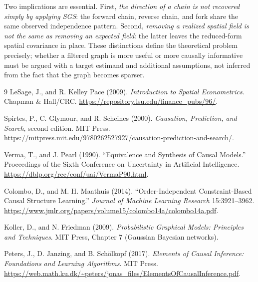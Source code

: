 \documentclass[11pt,a4paper]{article}
\begin{document}
Two implications are essential. First, \emph{the direction of a chain is not recovered simply by applying SGS}: the forward chain, reverse chain, and fork share the same observed independence pattern. Second, \emph{removing a realized spatial field is not the same as removing an expected field}: the latter leaves the reduced-form spatial covariance in place. These distinctions define the theoretical problem precisely; whether a filtered graph is more useful or more causally informative must be argued with a target estimand and additional assumptions, not inferred from the fact that the graph becomes sparser.

{\small
\begin{thebibliography}{9}
LeSage, J., and R. Kelley Pace (2009).
\emph{Introduction to Spatial Econometrics}. Chapman \& Hall/CRC.
\url{https://repository.lsu.edu/finance_pubs/96/}.

Spirtes, P., C. Glymour, and R. Scheines (2000).
\emph{Causation, Prediction, and Search}, second edition. MIT Press.
\url{https://mitpress.mit.edu/9780262527927/causation-prediction-and-search/}.

Verma, T., and J. Pearl (1990).
``Equivalence and Synthesis of Causal Models.''
Proceedings of the Sixth Conference on Uncertainty in Artificial Intelligence.
\url{https://dblp.org/rec/conf/uai/VermaP90.html}.

Colombo, D., and M. H. Maathuis (2014).
``Order-Independent Constraint-Based Causal Structure Learning.''
\emph{Journal of Machine Learning Research} 15:3921--3962.
\url{https://www.jmlr.org/papers/volume15/colombo14a/colombo14a.pdf}.

Koller, D., and N. Friedman (2009).
\emph{Probabilistic Graphical Models: Principles and Techniques}.
MIT Press, Chapter 7 (Gaussian Bayesian networks).

Peters, J., D. Janzing, and B. Sch\"olkopf (2017).
\emph{Elements of Causal Inference: Foundations and Learning Algorithms}.
MIT Press.
\url{https://web.math.ku.dk/~peters/jonas_files/ElementsOfCausalInference.pdf}.

\end{thebibliography}
}
\end{document}
